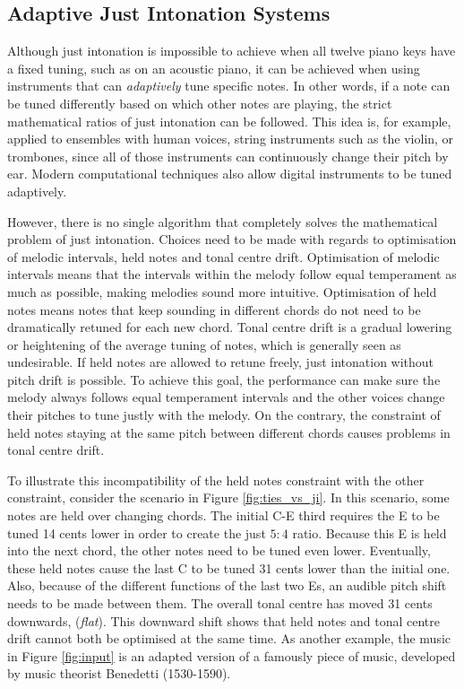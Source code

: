 \documentclass[a4paper]{article}
\begin{document}
\subsection{Adaptive Just Intonation Systems}
\label{intro_adaptive_ji}
Although just intonation is impossible to achieve when all twelve piano keys have a fixed tuning, such as on an acoustic piano, it can be achieved when using instruments that can \textit{adaptively} tune specific notes. In other words, if a note can be tuned differently based on which other notes are playing, the strict mathematical ratios of just intonation can be followed. This idea is, for example, applied to ensembles with human voices, string instruments such as the violin, or trombones, since all of those instruments can continuously change their pitch by ear. \cite{van_de_craats_fis_1989} Modern computational techniques also allow digital instruments to be tuned adaptively. \cite{sethares_adaptive_2005}

However, there is no single algorithm that completely solves the mathematical problem of just intonation. Choices need to be made with regards to optimisation of melodic intervals, held notes and tonal centre drift. Optimisation of melodic intervals means that the intervals within the melody follow equal temperament as much as possible, making melodies sound more intuitive. \cite{dougherty_choral_2004} Optimisation of held notes means notes that keep sounding in different chords do not need to be dramatically retuned for each new chord. Tonal centre drift is a gradual lowering or heightening of the average tuning of notes, which is generally seen as undesirable. \cite{barbershop_harmony_society_contest_2022} If held notes are allowed to retune freely, just intonation without pitch drift is possible. To achieve this goal, the performance can make sure the melody always follows equal temperament intervals and the other voices change their pitches to tune justly with the melody. \cite{dougherty_choral_2004} On the contrary, the constraint of held notes staying at the same pitch between different chords causes problems in tonal centre drift.

To illustrate this incompatibility of the held notes constraint with the other constraint, consider the scenario in Figure \ref{fig:ties_vs_ji}. In this scenario, some notes are held over changing chords. The initial C-E third requires the E to be tuned 14 cents lower in order to create the just $5:4$ ratio. Because this E is held into the next chord, the other notes need to be tuned even lower. Eventually, these held notes cause the last C to be tuned 31 cents lower than the initial one. Also, because of the different functions of the last two Es, an audible pitch shift needs to be made between them. The overall tonal centre has moved 31 cents downwards, (\textit{flat}). This downward shift shows that held notes and tonal centre drift cannot both be optimised at the same time. As another example, the music in Figure \ref{fig:input} is an adapted version of a famously  piece of music, developed by music theorist Benedetti (1530-1590). \cite{devaney_study_2012}
\end{document}
